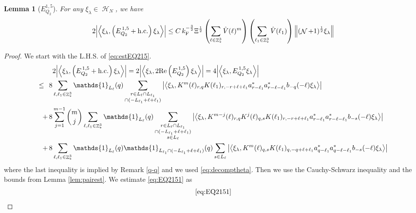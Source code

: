 \documentclass[12pt,a4paper]{article}
\numberwithin{equation}{section}
\newcommand{\1}{\mathbb{I}}
\newcommand{\F}{\mathrm{F}}
\DeclareMathOperator{\Z}{\mathbb{Z}}
\DeclareMathOperator{\HH}{\mathcal{H}}
\DeclareMathOperator{\NN}{\mathcal{N}}
\newcommand{\half}{\frac{1}{2}}
\newcommand{\eva}[1]{\left\langle #1 \right\rangle}
\theoremstyle{plain}
\newtheorem{lemma}[theorem]{Lemma}
\theoremstyle{definition}
\theoremstyle{remark}
\theoremstyle{plain}
\theoremstyle{definition}
\theoremstyle{remark}
\begin{document}
\begin{lemma}[$E_{Q_2}^{1,5}$]\label{lem:EQ215}
For any $\xi_\lambda \in \HH_N$, we have
	\begin{align}
    	2\abs{\eva{\xi_\lambda,\left(E^{\,1,5}_{Q_2}+\mathrm{h.c.}\right) \xi_\lambda }}
    	\leq C\, k_{\F}^{-\frac{3}{2}} \Xi^{\half} \left(\sum\limits_{\ell\in \Z^3_*} \hat{V}(\ell)^m \right) \left(\sum\limits_{\ell_1\in \Z^3_*} \hat{V}(\ell_1) \right) \norm{(\NN+1)^\half \xi_\lambda } \label{eq:estEQ215}
    \end{align}
\end{lemma}
\begin{proof}
We start with the L.H.S. of \eqref{eq:estEQ215}.
\begin{align}
    &2\abs{\eva{\xi_\lambda,\left(E^{\,1,5}_{Q_2}+\mathrm{h.c.}\right) \xi_\lambda }} = 2\abs{\eva{\xi_\lambda,2\mathrm{Re}\left(E^{\,1,5}_{Q_2}\right) \xi_\lambda }} = 4\abs{\eva{\xi_\lambda, E^{\,1,5}_{Q_2} \xi_\lambda }}\nonumber\\
    \leq\,\;8& \sum\limits_{\ell, \ell_1\in \Z^3_*} \mathds{1}_{L_{\ell}}(q) \sum\limits_{\substack{r\in L_{\ell} \cap L_{\ell_1} \\ \cap (-L_{\ell_1}+\ell+\ell_1)}} \abs{\eva{\xi_\lambda,  K^m(\ell)_{r,q} K(\ell_1)_{r,-r+\ell+\ell_1}  a^*_{r-\ell_1}a^*_{r-\ell-\ell_1}b_{-q}(-\ell)\xi_\lambda }} \label{eq:EQ2151}\\
    +\,8& \sum\limits_{j=1}^{m-1} {{m}\choose j} \sum\limits_{\ell, \ell_1\in \Z^3_*}\mathds{1}_{L_{\ell}}(q) \sum\limits_{\substack{r\in L_{\ell} \cap L_{\ell_1}\\ \cap (-L_{\ell_1}+\ell+\ell_1)\\ s \in L_{\ell}}}  \abs{\eva{\xi_\lambda, K^{m-j}(\ell)_{r,q} K^j(\ell)_{q,s} K(\ell_1)_{r,-r+\ell+\ell_1}  a^*_{r-\ell_1}a^*_{r-\ell-\ell_1}b_{-s}(-\ell) \xi_\lambda }} \label{eq:EQ2152}\\
    +\,8&\sum\limits_{\ell, \ell_1\in \Z^3_*} \mathds{1}_{L_{\ell}}(q) \mathds{1}_{L_{\ell_1}\cap (-L_{\ell_1}+\ell+\ell_1)}(q) \sum\limits_{ s \in L_{\ell}} \abs{\eva{\xi_\lambda, K^m(\ell)_{q,s} K(\ell_1)_{q,-q+\ell+\ell_1}  a^*_{q-\ell_1} a^*_{q-\ell-\ell_1} b_{-s}(-\ell) \xi_\lambda }} \label{eq:EQ2153}
\end{align}
where the last inequality is implied by Remark \ref{q-q} and we used \eqref{eq:decomptheta}.
Then we use the Cauchy-Schwarz inequality and the bounds from Lemma \ref{lem:pairest}.
We estimate \eqref{eq:EQ2151} as
\begin{align}
    &\eqref{eq:EQ2151}\nonumber\\

\end{align}
\end{proof}
\end{document}
